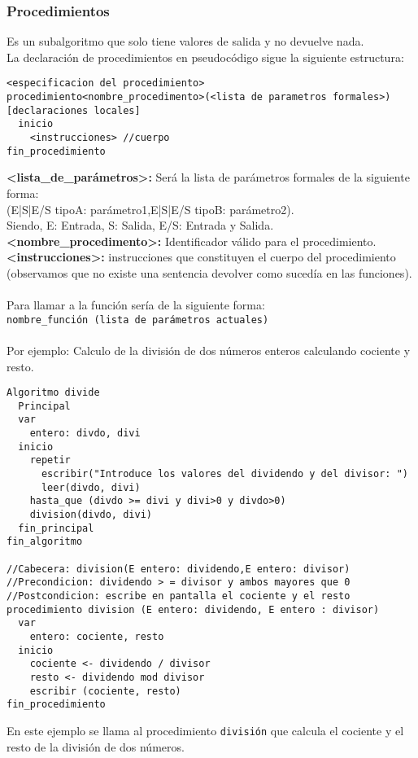 \documentclass[12pt,letterpaper]{article}
\begin{document}
\subsubsection{Procedimientos}

Es un subalgoritmo que solo tiene valores de salida y no devuelve nada.\\
La declaración de procedimientos en pseudocódigo sigue la siguiente estructura:
\newpage
\begin{lstlisting}
<especificacion del procedimiento>
procedimiento<nombre_procedimento>(<lista de parametros formales>)
[declaraciones locales]
  inicio
    <instrucciones> //cuerpo
fin_procedimiento
\end{lstlisting}
\textbf{<lista\_de\_parámetros>:} Será la lista de parámetros formales de la siguiente forma:\\
({E|S|E/S} tipoA: parámetro1,{E|S|E/S} tipoB: parámetro2).\\
Siendo, E: Entrada, S: Salida, E/S: Entrada y Salida.\\
\textbf{<nombre\_procedimento>:} Identificador válido para el procedimiento.\\
\textbf{<instrucciones>:} instrucciones que constituyen el cuerpo del procedimiento (observamos que no
existe una sentencia devolver como sucedía en las funciones).\\\\
Para llamar a la función sería de la siguiente forma:\\
\texttt{nombre\_función (lista de parámetros actuales)}\\\\
Por ejemplo: Calculo de la división de dos números enteros calculando cociente y resto.
\begin{lstlisting}
Algoritmo divide
  Principal
  var
    entero: divdo, divi
  inicio
    repetir
      escribir("Introduce los valores del dividendo y del divisor: ")
      leer(divdo, divi)
    hasta_que (divdo >= divi y divi>0 y divdo>0)
    division(divdo, divi)
  fin_principal
fin_algoritmo

//Cabecera: division(E entero: dividendo,E entero: divisor)
//Precondicion: dividendo > = divisor y ambos mayores que 0
//Postcondicion: escribe en pantalla el cociente y el resto
procedimiento division (E entero: dividendo, E entero : divisor)
  var
    entero: cociente, resto
  inicio
    cociente <- dividendo / divisor
    resto <- dividendo mod divisor
    escribir (cociente, resto)
fin_procedimiento
\end{lstlisting}
En este ejemplo se llama al procedimiento \texttt{división} que calcula el cociente y el resto de la división de dos números.
\end{document}
